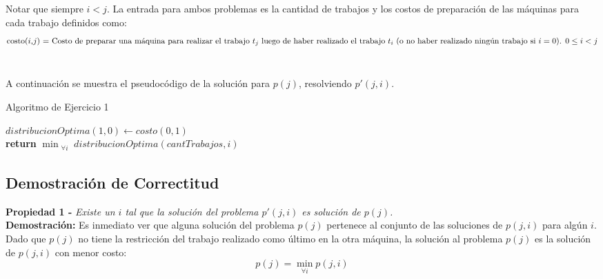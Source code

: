 \par{Notar que siempre $i < j$. La entrada para ambos problemas es la cantidad
de trabajos y los costos de preparación de las máquinas para cada trabajo
definidos como:}
\begin{equation*}
$costo($i$,$j$) = Costo de preparar una máquina para realizar el trabajo $t_j$ luego
de haber realizado el trabajo $t_i$ (o no haber realizado ningún trabajo si
$i=0$). $0 \leq i < j
\end{equation*}\\
\par{A continuación se muestra el pseudocódigo de la solución para $p(j)$,
resolviendo $p'(j,i)$.}\\
\begin{algorithm}[H]
	\caption{Algoritmo de Ejercicio 1}
	$distribucionOptima(1,0) \longleftarrow costo(0,1)$\\
	\textbf{return} $ \displaystyle \min_{\substack{\forall i}} distribucionOptima(cantTrabajos,i) $\\
\end{algorithm}

\subsection{Demostración de Correctitud}

\textbf{Propiedad 1 -}  \emph{ Existe un $i$ tal que la solución del problema $p'(j,i)$
es solución de $p(j)$. }\\

\textbf{Demostración:} Es inmediato ver que alguna solución del problema $p(j)$ pertenece al
conjunto de las soluciones de $p(j,i)$ para algún $i$. Dado que $p(j)$ no tiene
la restricción del trabajo realizado como último en la otra máquina, la solución al
problema $p(j)$ es la solución de $p(j,i)$ con menor costo:
$$p(j) = \min_{\forall i} p(j,i)$$

